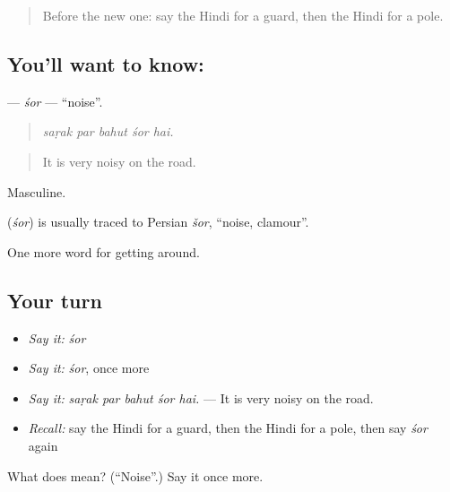 \label{lesson:HI-C423-sor}



\begin{quote}
Before the new one: say the Hindi for a guard, then the Hindi for a pole.
\end{quote}

\subsection*{You'll want to know: }
\textbf{} — \emph{śor} — \textquotedblleft{}noise\textquotedblright{}.

\begin{quote}
    
\end{quote}

\begin{quote}
\emph{saṛak par bahut śor hai.}
\end{quote}

\begin{quote}
It is very noisy on the road.
\end{quote}

Masculine.

\begin{cousinweb}
\textbf{} (\emph{śor}) is usually traced to Persian \emph{šor}, \textquotedblleft{}noise, clamour\textquotedblright{}.
\end{cousinweb}

\begin{grammarlens}[title={What you've built}]
One more word for getting around.
\end{grammarlens}

\subsection*{Your turn}
\begin{itemize}
\raggedright
  \item \emph{Say it:} \emph{śor}
  \item \emph{Say it:} \emph{śor}, once more
  \item \emph{Say it:} \emph{saṛak par bahut śor hai.} — It is very noisy on the road.
  \item \emph{Recall:} say the Hindi for a guard, then the Hindi for a pole, then say \emph{śor} again
\end{itemize}

\begin{tcolorbox}[breakable,colback=teal!4,colframe=teal!35!black,title={Before you move on}]
What does  mean? (\textquotedblleft{}Noise\textquotedblright{}.) Say it once more.
\end{tcolorbox}
